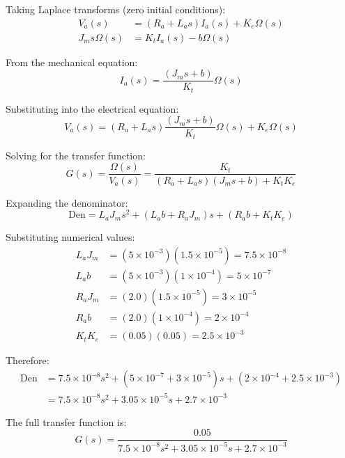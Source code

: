 Taking Laplace transforms (zero initial conditions):
\begin{align}
    V_a(s) &= (R_a + L_a s) I_a(s) + K_e \Omega(s) \\
    J_m s \Omega(s) &= K_t I_a(s) - b \Omega(s)
\end{align}

From the mechanical equation:
\begin{equation}
    I_a(s) = \frac{(J_m s + b)}{K_t} \Omega(s)
\end{equation}

Substituting into the electrical equation:
\begin{equation}
    V_a(s) = (R_a + L_a s) \frac{(J_m s + b)}{K_t} \Omega(s) + K_e \Omega(s)
\end{equation}

Solving for the transfer function:
\begin{equation}
    G(s) = \frac{\Omega(s)}{V_a(s)} = \frac{K_t}{(R_a + L_a s)(J_m s + b) + K_t K_e}
\end{equation}

Expanding the denominator:
\begin{equation}
    \text{Den} = L_a J_m s^2 + (L_a b + R_a J_m) s + (R_a b + K_t K_e)
\end{equation}

Substituting numerical values:
\begin{align}
    L_a J_m &= (5 \times 10^{-3})(1.5 \times 10^{-5}) = 7.5 \times 10^{-8} \\
    L_a b &= (5 \times 10^{-3})(1 \times 10^{-4}) = 5 \times 10^{-7} \\
    R_a J_m &= (2.0)(1.5 \times 10^{-5}) = 3 \times 10^{-5} \\
    R_a b &= (2.0)(1 \times 10^{-4}) = 2 \times 10^{-4} \\
    K_t K_e &= (0.05)(0.05) = 2.5 \times 10^{-3}
\end{align}

Therefore:
\begin{align}
    \text{Den} &= 7.5 \times 10^{-8} s^2 + (5 \times 10^{-7} + 3 \times 10^{-5}) s + (2 \times 10^{-4} + 2.5 \times 10^{-3}) \\
    &= 7.5 \times 10^{-8} s^2 + 3.05 \times 10^{-5} s + 2.7 \times 10^{-3}
\end{align}

The full transfer function is:
\begin{equation}
    \boxed{G(s) = \frac{0.05}{7.5 \times 10^{-8} s^2 + 3.05 \times 10^{-5} s + 2.7 \times 10^{-3}}}
\end{equation}

